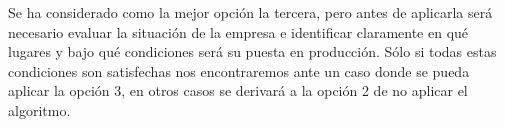 Se ha considerado como la mejor opción la tercera, pero antes de aplicarla será necesario 
evaluar la situación de la empresa e identificar claramente en qué lugares y bajo qué 
condiciones será su puesta en producción. Sólo si todas estas condiciones son satisfechas 
nos encontraremos ante un caso donde se pueda aplicar la opción 3, en otros casos se derivará 
a la opción 2 de no aplicar el algoritmo.

